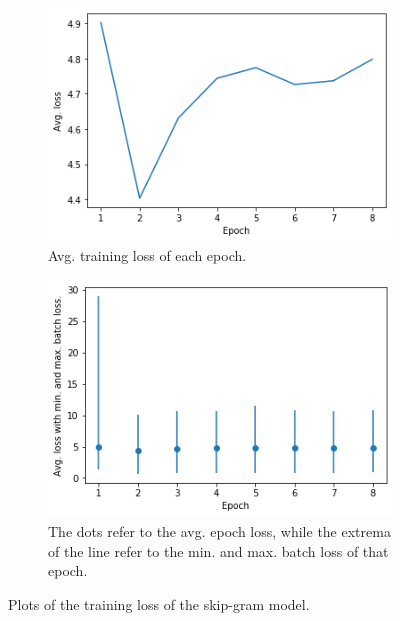 \begin{figure}
  \begin{subfigure}[t]{0.5\textwidth}
    \centering
    \includegraphics[width=\textwidth]{figures/unsupervised_approach/loss_avgs.png}
    \caption{Avg. training loss of each epoch.}
    \label{fig:loss_avgs}
  \end{subfigure}
  \hfill
  \begin{subfigure}[t]{0.5\textwidth}
    \centering
    \includegraphics[width=\textwidth]{figures/unsupervised_approach/loss_avgs_range.png}
    \caption{The dots refer to the avg. epoch loss, while the extrema of the line refer to the min. and max. batch loss of that epoch.}
    \label{fig:loss_avgs_range}
  \end{subfigure}
  \caption{Plots of the training loss of the skip-gram model.}
\end{figure}



